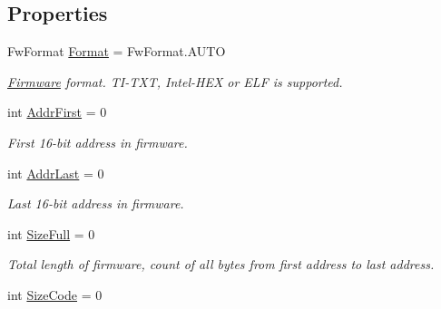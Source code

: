 \subsection*{Properties}
\begin{DoxyCompactItemize}
\item 
Fw\+Format \mbox{\hyperlink{class_b_s_l430___n_e_t_1_1_firmware_tools_1_1_fw_tools_1_1_fw_info_af50c2a855e56a7e3a87c3219137637bc}{Format}} = Fw\+Format.\+A\+U\+TO
\begin{DoxyCompactList}\small\item\em \mbox{\hyperlink{class_b_s_l430___n_e_t_1_1_firmware_tools_1_1_fw_tools_1_1_firmware}{Firmware}} format. T\+I-\/\+T\+XT, Intel-\/\+H\+EX or E\+LF is supported. \end{DoxyCompactList}\item 
int \mbox{\hyperlink{class_b_s_l430___n_e_t_1_1_firmware_tools_1_1_fw_tools_1_1_fw_info_a8f99029513e4a9c26a7f607d1d015abb}{Addr\+First}} = 0
\begin{DoxyCompactList}\small\item\em First 16-\/bit address in firmware. \end{DoxyCompactList}\item 
int \mbox{\hyperlink{class_b_s_l430___n_e_t_1_1_firmware_tools_1_1_fw_tools_1_1_fw_info_a972614613b4729dbbc36a06e240fb50b}{Addr\+Last}} = 0
\begin{DoxyCompactList}\small\item\em Last 16-\/bit address in firmware. \end{DoxyCompactList}\item 
int \mbox{\hyperlink{class_b_s_l430___n_e_t_1_1_firmware_tools_1_1_fw_tools_1_1_fw_info_ac64507db9efca6fd8958637bf06fe8a3}{Size\+Full}} = 0
\begin{DoxyCompactList}\small\item\em Total length of firmware, count of all bytes from first address to last address. \end{DoxyCompactList}\item 
int \mbox{\hyperlink{class_b_s_l430___n_e_t_1_1_firmware_tools_1_1_fw_tools_1_1_fw_info_a8da28ad0778ba66a5f7b98d188ad159f}{Size\+Code}} = 0

\end{DoxyCompactItemize}
